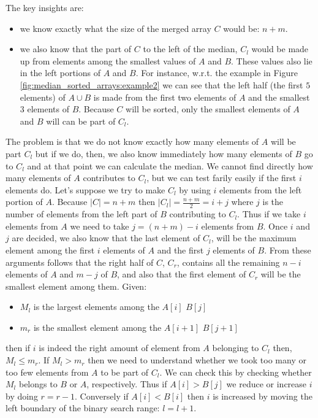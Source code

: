 The key insights are:
\begin{itemize}
	\item we know exactly what the size of the merged array $C$ would be: $n+m$.
	\item we also know that the part of $C$ to the left of the median, $C_l$ would be made up from elements among the smallest values of $A$
	and $B$. These values also lie in the left portions of $A$ and $B$. For instance, w.r.t. the example in Figure \ref{fig:median_sorted_arrays:example2} we
	can see that the left half (the first $5$ elements) of $A \cup B$ is made from the first two elements
	of $A$ and the smallest $3$ elements of $B$. Because $C$ will be sorted, only the smallest
	elements of $A$ and $B$ will can be part of $C_l$.
\end{itemize}
The problem is that we do not know exactly how many elements of $A$ will be part $C_l$ but if we do, then, we also know immediately how many elements of $B$ go to $C_l$
and at that point we can calculate the median.
We cannot find directly how many elements  of $A$ contributes to $C_l$, but we can test farily easily if the first $i$ elements do.
Let's suppose we try to make $C_l$ by using $i$ elements from the left portion of $A$.
Because $|C|=n+m$ then $|C_l| = \frac{n+m}{2} = i+j$ where $j$ is the number of elements from the left part of $B$ contributing to $C_l$. 
Thus if we take $i$ elements from $A$ we need to take $j = (n+m)-i$ elements from $B$. 
Once $i$ and $j$ are decided, we also know that the last element of $C_l$, will be the maximum element among the first $i$ elements of $A$ and the first $j$ elements of $B$.
From these arguments follows that the right half of $C$, $C_r$,  contains all the remaining $n-i$ elements of $A$ and $m-j$ of $B$, 
and also that the first element of $C_r$ will be the smallest element among them.
Given:
\begin{itemize}
	\item $M_l$ is the largest elements among the $A[i]$  $B[j]$
	\item $m_r$ is the smallest element among the $A[i+1]$  $B[j+1]$
\end{itemize} 
then if $i$ is indeed the right amount of element from $A$ belonging to $C_l$ then, $M_l \leq m_r$.
If $M_l > m_r$ then we need to understand whether we took too many or too few elements from $A$ to be part of $C_l$. 
We can check this by checking whether  $M_l$ belongs to $B$ or $A$, respectively. 
Thus if $A[i] > B[j]$ we reduce or increase $i$ by doing $r = r-1$. 
Conversely if $A[i] < B[i]$ then $i$ is increased by moving the left boundary of the binary search range: $l = l+1$.

